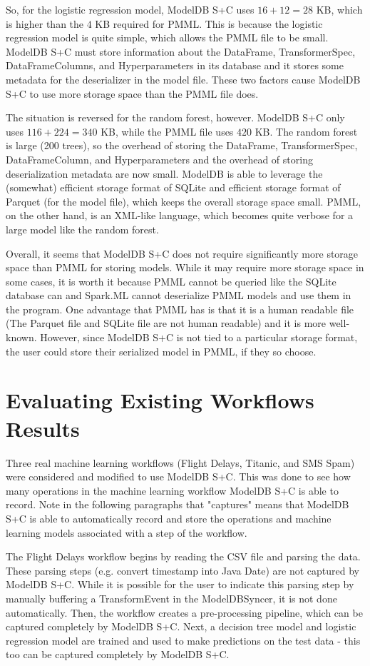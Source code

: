  So, for the logistic regression model, ModelDB S+C uses $16 + 12 = 28$ KB, which is
 higher than the $4$ KB required for PMML. This is because the logistic regression model
 is quite simple, which allows the PMML file to be small. ModelDB S+C must store information
 about the DataFrame, TransformerSpec, DataFrameColumns, and Hyperparameters in its database and
 it stores some metadata for the deserializer in the model file. These two factors cause ModelDB S+C
 to use more storage space than the PMML file does.

 The situation is reversed for the random forest, however. ModelDB S+C only uses $116 + 224 = 340$ KB,
 while the PMML file uses $420$ KB. The random forest is large (200 trees), so the overhead of storing the DataFrame,
 TransformerSpec, DataFrameColumn, and Hyperparameters and the overhead of storing deserialization metadata are now small.
 ModelDB is able to leverage the (somewhat) efficient storage format of SQLite and efficient storage format of Parquet (for 
 the model file), which keeps the overall storage space small. PMML, on the other hand, is an XML-like language, which becomes
 quite verbose for a large model like the random forest.

 Overall, it seems that ModelDB S+C does not require significantly more storage space than PMML for storing models. 
 While it may require more storage space in some cases, it is worth it because PMML cannot be queried like the SQLite
 database can and Spark.ML cannot deserialize PMML models and use them in the program. One advantage that PMML
 has is that it is a human readable file (The Parquet file and SQLite file are not human readable) and it is more well-known. 
 However, since ModelDB S+C is not tied to a particular storage format, the user could store their serialized model in PMML, 
 if they so choose.

\section{Evaluating Existing Workflows Results}
Three real machine learning workflows (Flight Delays, Titanic, and SMS Spam) were
considered and modified to use ModelDB S+C. This was done to see how many operations in the
machine learning workflow ModelDB S+C is able to record. Note in the following paragraphs that "captures"
means that ModelDB S+C is able to automatically record and store the operations and machine learning models
associated with a step of the workflow.

The Flight Delays workflow begins by reading the CSV file and parsing the data. These parsing
steps (e.g. convert timestamp into Java Date) are not captured by ModelDB S+C. While it is possible
for the user to indicate this parsing step by manually buffering a TransformEvent in the ModelDBSyncer,
it is not done automatically. Then, the workflow creates a pre-processing pipeline, which can be captured
completely by ModelDB S+C. Next, a decision tree model and logistic regression model are trained and
used to make predictions on the test data - this too can be captured completely by ModelDB S+C.


